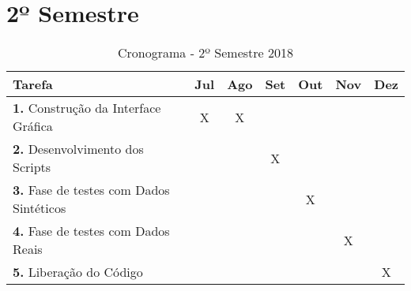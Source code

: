     \section{2º Semestre}
    
    \begin{table}[h]
    \caption{Cronograma - 2º Semestre 2018}
    
    \begin{center}
    \centering
    \begin{tabular}{|l|c|c|c|c|c|c|}
    
    \hline
    {\bf Tarefa}                    		 & {\bf Jul}& {\bf Ago}& {\bf Set}& {\bf Out}& {\bf Nov}& {\bf Dez}\\  
    \hline
    {\bf 1.} Construção da Interface Gráfica 	 &X 	    & X	       & 	  & 	     & 	        & 	   \\ 
    \hline
    {\bf 2.} Desenvolvimento dos Scripts         & 	    & 	       & X	  & 	     & 	        & 	   \\ 
    \hline
    {\bf 3.} Fase de testes com Dados Sintéticos & 	    & 	       & 	  & X	     & 	        & 	   \\ 
    \hline
    {\bf 4.} Fase de testes com Dados Reais      & 	    & 	       & 	  & 	     &X	        & 	   \\ 
    \hline
    {\bf 5.} Liberação do Código                 & 	    & 	       & 	  & 	     & 	        & X	   \\ 
    \hline
    
   
    
    
    \end{tabular}
 
   
    \end{center}

    \end{table}
